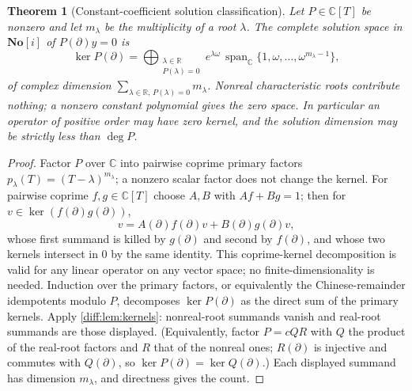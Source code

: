 \documentclass[11pt,letterpaper]{article}
\numberwithin{equation}{section}
\newtheorem{theorem}{Theorem}[section]
\theoremstyle{definition}
\theoremstyle{remark}
\newcommand{\SC}{\mathbf{No}[i]}
\newcommand{\R}{\mathbb R}
\newcommand{\C}{\mathbb C}
\newcommand{\der}{\partial}
\newcommand{\Span}{\operatorname{span}}
\newcommand{\Ker}{\operatorname{ker}}
\begin{document}
\begin{theorem}[Constant-coefficient solution classification]
\label{diff:thm:constant}
Let $P\in\C[T]$ be nonzero and let $m_{\lambda}$ be the multiplicity of a root
$\lambda$. The complete solution space in $\SC$ of $P(\der)y=0$ is
\begin{equation}\label{diff:eq:constantkernel}
 \Ker P(\der)=
 \bigoplus_{\substack{\lambda\in\R\\ P(\lambda)=0}}
 e^{\lambda\omega}\,
 \Span_{\C}\{1,\omega,\dots,\omega^{m_{\lambda}-1}\},
\end{equation}
of complex dimension $\sum_{\lambda\in\R,\,P(\lambda)=0}m_{\lambda}$. Nonreal
characteristic roots contribute nothing; a nonzero constant polynomial gives
the zero space. In particular an operator of positive order may have zero
kernel, and the solution dimension may be strictly less than $\deg P$.
\end{theorem}
\begin{proof}
Factor $P$ over $\C$ into pairwise coprime primary factors
$p_{\lambda}(T)=(T-\lambda)^{m_{\lambda}}$; a nonzero scalar factor does not
change the kernel. For pairwise coprime $f,g\in\C[T]$ choose $A,B$ with
$Af+Bg=1$; then for $v\in\Ker(f(\der)g(\der))$,
\[
 v=A(\der)f(\der)v+B(\der)g(\der)v,
\]
whose first summand is killed by $g(\der)$ and second by $f(\der)$, and whose
two kernels intersect in $0$ by the same identity. This coprime-kernel
decomposition is valid for any linear operator on any vector space; no
finite-dimensionality is needed. Induction over the primary factors, or
equivalently the Chinese-remainder idempotents modulo $P$, decomposes
$\Ker P(\der)$ as the direct sum of the primary kernels. Apply
\cref{diff:lem:kernels}: nonreal-root summands vanish and real-root summands
are those displayed. (Equivalently, factor $P=cQR$ with $Q$ the product of the
real-root factors and $R$ that of the nonreal ones; $R(\der)$ is injective and
commutes with $Q(\der)$, so $\Ker P(\der)=\Ker Q(\der)$.) Each displayed
summand has dimension $m_{\lambda}$, and directness gives the count.
\end{proof}
\end{document}
